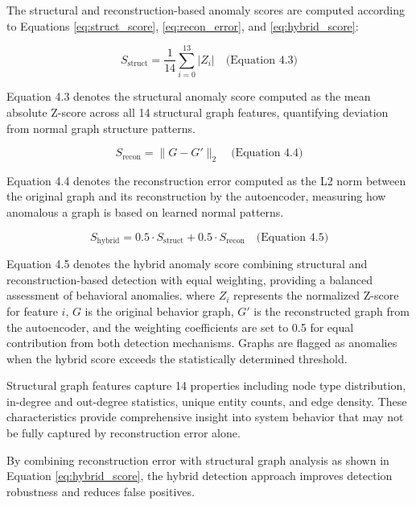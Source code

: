 The structural and reconstruction-based anomaly scores are computed according to Equations \ref{eq:struct_score}, \ref{eq:recon_error}, and \ref{eq:hybrid_score}:

\begin{equation}
S_{\text{struct}} = \frac{1}{14}\sum_{i=0}^{13} |Z_i| \quad \text{(Equation 4.3)}
\label{eq:struct_score}
\end{equation}

Equation 4.3 denotes the structural anomaly score computed as the mean absolute Z-score across all 14 structural graph features, quantifying deviation from normal graph structure patterns.

\begin{equation}
S_{\text{recon}} = \|G - G'\|_2 \quad \text{(Equation 4.4)}
\label{eq:recon_error}
\end{equation}

Equation 4.4 denotes the reconstruction error computed as the L2 norm between the original graph and its reconstruction by the autoencoder, measuring how anomalous a graph is based on learned normal patterns.

\begin{equation}
S_{\text{hybrid}} = 0.5 \cdot S_{\text{struct}} + 0.5 \cdot S_{\text{recon}} \quad \text{(Equation 4.5)}
\label{eq:hybrid_score}
\end{equation}

Equation 4.5 denotes the hybrid anomaly score combining structural and reconstruction-based detection with equal weighting, providing a balanced assessment of behavioral anomalies. where $Z_i$ represents the normalized Z-score for feature $i$, $G$ is the original behavior graph, $G'$ is the reconstructed graph from the autoencoder, and the weighting coefficients are set to 0.5 for equal contribution from both detection mechanisms. Graphs are flagged as anomalies when the hybrid score exceeds the statistically determined threshold.

Structural graph features capture 14 properties including node type distribution, in-degree and out-degree statistics, unique entity counts, and edge density. These characteristics provide comprehensive insight into system behavior that may not be fully captured by reconstruction error alone.

By combining reconstruction error with structural graph analysis as shown in Equation \ref{eq:hybrid_score}, the hybrid detection approach improves detection robustness and reduces false positives.


